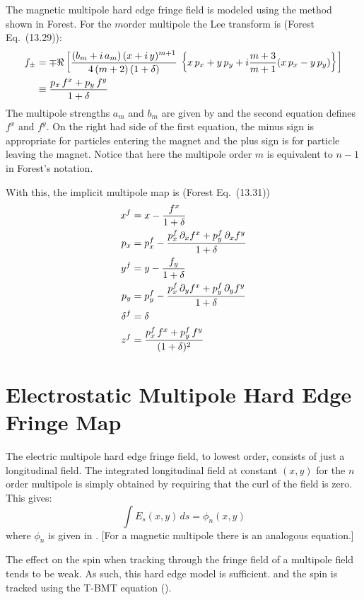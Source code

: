 {The magnetic multipole hard edge fringe field is modeled using the method shown in
Forest\cite{b:forest}. For the $m$\Th order multipole the Lee transform 
is (Forest Eq.~(13.29)):
\begin{align}
  f_\pm &= \mp \Re \left[ \frac{(b_m + i \, a_m) \, 
    (x + i \, y)^{m+1}}{4 \, (m + 2) \, (1 + \delta)} \,
    \left\{ x \, p_x + y \, p_y + i \frac{m+3}{m+1} 
    (x \, p_x - y \, p_y) \right\} \right] \nonumber \\
  &\equiv \frac{p_x \, f^x + p_y \, f^y}{1 + \delta}
\end{align}
The multipole strengths $a_m$ and $b_m$ are given by 
and the second equation defines $f^x$ and $f^y$. On the right had side of the first
equation, the minus sign is appropriate for particles entering the magnet and the
plus sign is for particle leaving the magnet.
Notice that here the multipole order $m$ is equivalent to $n-1$ in Forest's notation.

With this, the implicit multipole map is (Forest Eq.~(13.31))
\begin{align}
  x^f &= x - \frac{f^x}{1 + \delta} \nonumber \\
  p_x &= p_x^f - \frac{p_x^f \, \partial_x f^x + p_y^f \, \partial_x f^y}{1 + \delta} \nonumber \\
  y^f &= y - \frac{f_y}{1 + \delta} \\
  p_y &= p_y^f - \frac{p_x^f \, \partial_y f^x + p_y^f \, \partial_y f^y}{1 + \delta} \nonumber \\
  \delta^f &= \delta \nonumber \\
  z^f &=\frac{p_x^f \, f^x + p_y^f \, f^y}{(1 + \delta)^2} \nonumber
\end{align}

\section{Electrostatic Multipole Hard Edge Fringe Map}
\label{s:spin.hard.fringe}

The electric multipole hard edge fringe field, to lowest order, consists of just a longitudinal
field. The integrated longitudinal field at constant $(x,y)$ for the $n$\Th order multipole is
simply obtained by requiring that the curl of the field is zero.  This gives:
\begin{equation}
  \int E_s(x,y) \, ds = \phi_n(x,y)
\end{equation}
where $\phi_n$ is given in . [For a magnetic multipole there is an analogous
equation.]

The effect on the spin when tracking through the fringe field of a multipole field tends
to be weak. As such, this hard edge model is sufficient.  and the spin is tracked using
the T-BMT equation ().

}
